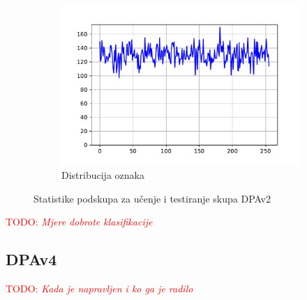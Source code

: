 \documentclass[times, utf8, numeric, diplomski]{fer}
\def\TODO#1{\noindent\textcolor{red}{TODO: \textit{#1}}\newline}
\def\todo#1{\TODO{#1}}
\begin{document}
\begin{figure}[H]
\begin{subfigure}{.5\textwidth}
\includegraphics[width=\textwidth]{ds_nl256_ts_outputs.pdf}
\centering
\caption{Distribucija oznaka}
\label{fig:dpa2_test_outputs}
\end{subfigure}
\caption{Statistike podskupa za učenje i testiranje skupa DPAv2}
\end{figure}

\todo{Mjere dobrote klasifikacije}

\subsection{DPAv4}
\todo{Kada je napravljen i ko ga je radilo}
\end{document}
